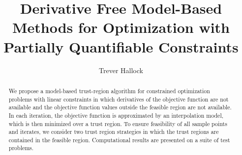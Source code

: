 \documentclass{article}
\title{Derivative Free Model-Based Methods for Optimization with Partially Quantifiable Constraints}
\author{Trever Hallock}
\begin{document}
\maketitle

\begin{abstract}

We propose a model-based trust-region algorithm for constrained optimization problems with linear constraints in which derivatives of the objective function are not available and the objective function values outside the feasible region are not available.
In each iteration, the objective function is approximated by an interpolation model, which is then minimized over a trust region.
To ensure feasibility of all sample points and iterates, we consider two trust region strategies in which the trust regions are contained in the feasible region.
Computational results are presented on a suite of test problems.

\end{abstract}

\newpage

\tableofcontents

\newpage



\newpage



\appendix





\end{document}
